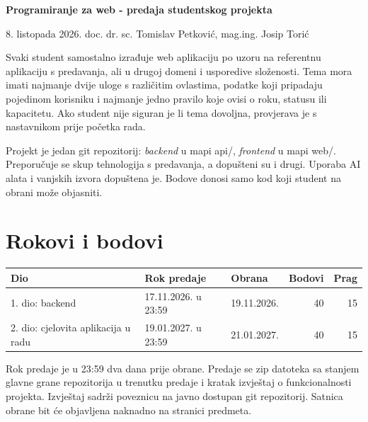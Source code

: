 \documentclass[10pt,a4paper]{article}
\newcommand{\code}[1]{{\ttfamily #1}}
\newcommand{\zaglavlje}{\rowcolor{tint}}
\begin{document}
{\color{ink}\fontsize{18}{22}\selectfont\bfseries Programiranje za web - predaja studentskog projekta\par}
\vspace{0.2em}
{\color{muted}8. listopada 2026. \textperiodcentered{} doc. dr. sc. Tomislav Petković, mag.ing. Josip Torić\par}

\vspace{0.6em}
Svaki student samostalno izrađuje web aplikaciju po uzoru na referentnu aplikaciju s predavanja, ali u drugoj domeni i usporedive složenosti. Tema mora imati najmanje dvije uloge s različitim ovlastima, podatke koji pripadaju pojedinom korisniku i najmanje jedno pravilo koje ovisi o roku, statusu ili kapacitetu. Ako student nije siguran je li tema dovoljna, provjerava je s nastavnikom prije početka rada.

Projekt je jedan git repozitorij: \emph{backend} u mapi \code{api/}, \emph{frontend} u mapi \code{web/}. Preporučuje se skup tehnologija s predavanja, a dopušteni su i drugi. Uporaba AI alata i vanjskih izvora dopuštena je. Bodove donosi samo kod koji student na obrani može objasniti.

\section{Rokovi i bodovi}

\begin{center}\small
\begin{tabularx}{\linewidth}{Lllrr}
\toprule
\zaglavlje \textbf{Dio} & \textbf{Rok predaje} & \textbf{Obrana} & \textbf{Bodovi} & \textbf{Prag}\\
. dio: backend & 17.11.2026. u 23:59 & 19.11.2026. & 40 & 15\\
2. dio: cjelovita aplikacija u radu & 19.01.2027. u 23:59 & 21.01.2027. & 40 & 15\\
\bottomrule
\end{tabularx}
\end{center}

Rok predaje je u 23:59 dva dana prije obrane. Predaje se zip datoteka sa stanjem glavne grane repozitorija u trenutku predaje i kratak izvještaj o funkcionalnosti projekta. Izvještaj sadrži poveznicu na javno dostupan git repozitorij. Satnica obrane bit će objavljena naknadno na stranici predmeta.
\end{document}
